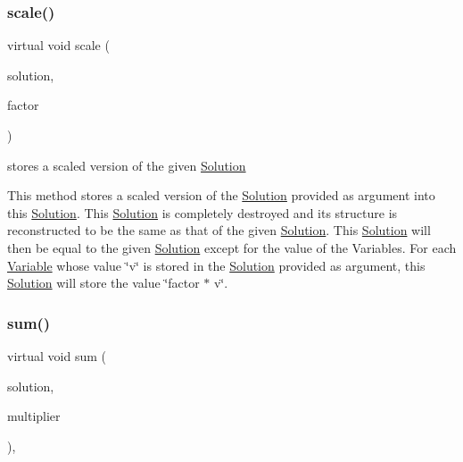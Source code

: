 \subsubsection{\texorpdfstring{scale()}{scale()}\hspace{0.1cm}{\footnotesize\ttfamily [2/2]}}
{\footnotesize\ttfamily virtual void scale (\begin{DoxyParamCaption}\item[{const \mbox{\hyperlink{class_s_m_spp__di__unipi__it_1_1_col_variable_solution}{Col\+Variable\+Solution}} $\ast$const}]{solution,  }\item[{const double}]{factor }\end{DoxyParamCaption})\hspace{0.3cm}{\ttfamily [virtual]}}



stores a scaled version of the given \mbox{\hyperlink{class_s_m_spp__di__unipi__it_1_1_solution}{Solution}} 

This method stores a scaled version of the \mbox{\hyperlink{class_s_m_spp__di__unipi__it_1_1_solution}{Solution}} provided as argument into this \mbox{\hyperlink{class_s_m_spp__di__unipi__it_1_1_solution}{Solution}}. This \mbox{\hyperlink{class_s_m_spp__di__unipi__it_1_1_solution}{Solution}} is completely destroyed and its structure is reconstructed to be the same as that of the given \mbox{\hyperlink{class_s_m_spp__di__unipi__it_1_1_solution}{Solution}}. This \mbox{\hyperlink{class_s_m_spp__di__unipi__it_1_1_solution}{Solution}} will then be equal to the given \mbox{\hyperlink{class_s_m_spp__di__unipi__it_1_1_solution}{Solution}} except for the value of the Variables. For each \mbox{\hyperlink{class_s_m_spp__di__unipi__it_1_1_variable}{Variable}} whose value \char`\"{}v\char`\"{} is stored in the \mbox{\hyperlink{class_s_m_spp__di__unipi__it_1_1_solution}{Solution}} provided as argument, this \mbox{\hyperlink{class_s_m_spp__di__unipi__it_1_1_solution}{Solution}} will store the value \char`\"{}factor $\ast$ v\char`\"{}. \mbox{\label{class_s_m_spp__di__unipi__it_1_1_col_variable_solution_abf263a2361d4099d9fe7fd4cddc7f7ec}} 
\subsubsection{\texorpdfstring{sum()}{sum()}}
{\footnotesize\ttfamily virtual void sum (\begin{DoxyParamCaption}\item[{const \mbox{\hyperlink{class_s_m_spp__di__unipi__it_1_1_solution}{Solution}} $\ast$}]{solution,  }\item[{double}]{multiplier }\end{DoxyParamCaption})\hspace{0.3cm}{\ttfamily [override]}, {\ttfamily [virtual]}}



